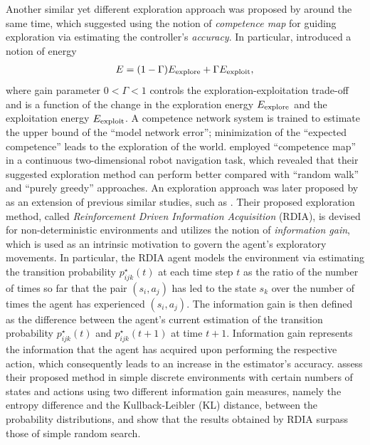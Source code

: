 Another similar yet different exploration approach was proposed by  around the same time, which suggested using the notion of \emph{competence map} for guiding exploration via estimating the controller's \emph{accuracy}. In particular,  introduced a notion of energy 
\begin{align}
E = (1-\Gamma)E_{\mbox{\scriptsize explore}} +\Gamma E_{\mbox{\scriptsize exploit}},
\end{align}
where gain parameter $0<\Gamma<1$ controls the exploration-exploitation trade-off and is a function of the change in the exploration energy $E_{\mbox{\scriptsize explore}}$ and the exploitation energy $E_{\mbox{\scriptsize exploit}}$. A competence network system is trained to estimate the upper bound of the ``model network error''; minimization of the ``expected competence'' leads to the exploration of the world.  employed ``competence map'' in a continuous two-dimensional robot navigation task, which revealed that their suggested exploration method can perform better compared with ``random walk'' and ``purely greedy'' approaches. 
An exploration approach was later proposed by  as an extension of previous similar studies, such as . Their proposed exploration method, called \emph{Reinforcement Driven Information Acquisition} (RDIA), is devised for non-deterministic environments and utilizes the notion of \emph{information gain}, which is used as an intrinsic motivation to govern the agent’s exploratory movements. In particular, the RDIA agent models the environment via estimating the transition probability $p^\star_{ijk}(t)$ at each time step $t$ as the ratio of the number of times so far that the pair $(s_i, a_j)$ has led to the state $s_k$ over the number of times the agent has experienced $(s_i, a_j)$. The information gain is then defined as the difference between the agent’s current estimation of the transition probability $p^\star_{ijk}(t)$ and $p^\star_{ijk}(t+1)$ at time $t+1$. Information gain represents the information that the agent has acquired upon performing the respective action, which consequently leads to an increase in the estimator’s accuracy.  assess their proposed method in simple discrete environments with certain numbers of states and actions using two different information gain measures, namely the entropy difference and the Kullback-Leibler (KL) distance, between the probability distributions, and show that the results obtained by RDIA surpass those of simple random search.
